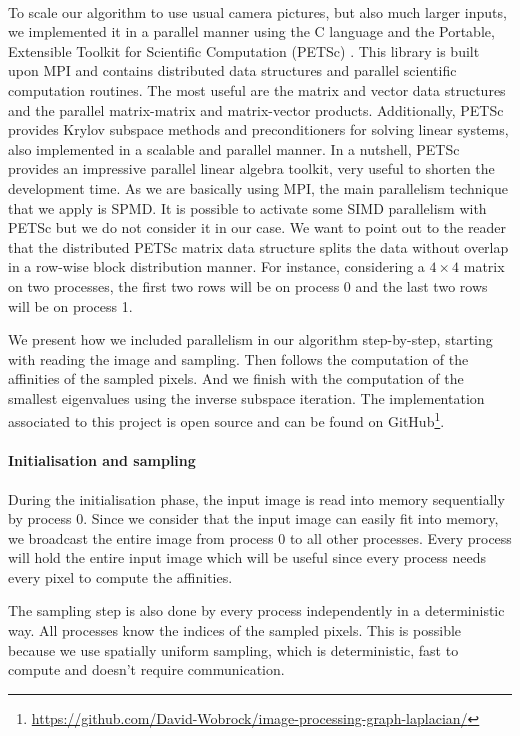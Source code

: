 \paragraph{}
To scale our algorithm to use usual camera pictures, but also much larger inputs, we implemented it in a parallel manner using the C language and the Portable, Extensible Toolkit for Scientific Computation (PETSc) \cite{petsc_web_page}.
This library is built upon MPI and contains distributed data structures and parallel scientific computation routines.
The most useful are the matrix and vector data structures and the parallel matrix-matrix and matrix-vector products.
Additionally, PETSc provides Krylov subspace methods and preconditioners for solving linear systems, also implemented in a scalable and parallel manner.
In a nutshell, PETSc provides an impressive parallel linear algebra toolkit, very useful to shorten the development time.
As we are basically using MPI, the main parallelism technique that we apply is SPMD.
It is possible to activate some SIMD parallelism with PETSc but we do not consider it in our case.
We want to point out to the reader that the distributed PETSc matrix data structure splits the data without overlap in a row-wise block distribution manner.
For instance, considering a \(4 \times 4\) matrix on two processes, the first two rows will be on process 0 and the last two rows will be on process 1.

We present how we included parallelism in our algorithm step-by-step, starting with reading the image and sampling.
Then follows the computation of the affinities of the sampled pixels.
And we finish with the computation of the smallest eigenvalues using the inverse subspace iteration.
The implementation associated to this project is open source and can be found on GitHub\footnote{\url{https://github.com/David-Wobrock/image-processing-graph-laplacian/}}.

\paragraph{Initialisation and sampling}
During the initialisation phase, the input image is read into memory sequentially by process 0.
Since we consider that the input image can easily fit into memory, we broadcast the entire image from process 0 to all other processes.
Every process will hold the entire input image which will be useful since every process needs every pixel to compute the affinities.

The sampling step is also done by every process independently in a deterministic way.
All processes know the indices of the sampled pixels.
This is possible because we use spatially uniform sampling, which is deterministic, fast to compute and doesn't require communication.

